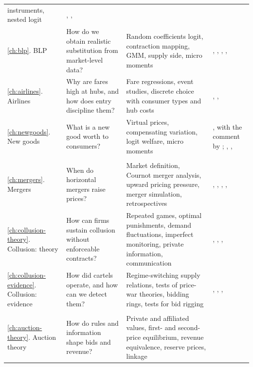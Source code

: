 \begin{table}[htbp]
\begin{tabularx}{\textwidth}{@{}>{\raggedright\arraybackslash}p{1.95cm}
  >{\raggedright\arraybackslash}X >{\raggedright\arraybackslash}X >{\raggedright\arraybackslash}X@{}}
  instruments, nested logit & \citet{Berry1994}, \citet{Einav2007}, \citet{Hendel1999} \\
\ref{ch:blp}. BLP & How do we obtain realistic substitution from market-level data? & Random coefficients
  logit, contraction mapping, GMM, supply side, micro moments & \citet{BerryLevinsohnPakes1995},
  \citet{Nevo2000a}, \citet{Nevo2001}, \citet{BerryLevinsohnPakes2004}, \citet{Goldberg1995} \\
\ref{ch:airlines}. Airlines & Why are fares high at hubs, and how does entry discipline them? & Fare
  regressions, event studies, discrete choice with consumer types and hub costs & \citet{Borenstein1989},
  \citet{WhinstonCollins1992}, \citet{BerryCarnallSpiller2006} \\
\ref{ch:newgoods}. New goods & What is a new good worth to consumers? & Virtual prices, compensating variation,
  logit welfare, micro moments & \citet{Hausman1997}, with the comment by \citet{Bresnahan1997};
  \citet{Trajtenberg1989}, \citet{Petrin2002}, \citet{Gentzkow2007} \\
\addlinespace
\multicolumn{4}{@{}l}{\textit{Part III. Competition policy}} \\
\ref{ch:mergers}. Mergers & When do horizontal mergers raise prices? & Market definition, Cournot merger
  analysis, upward pricing pressure, merger simulation, retrospectives & \citet{FarrellShapiro1990},
  \citet{FarrellShapiro2010}, \citet{Nevo2000b}, \citet{BjornerstedtVerboven2016},
  \citet{MillerWeinberg2017} \\
\ref{ch:collusion-theory}. Collusion: theory & How can firms sustain collusion without enforceable contracts? &
  Repeated games, optimal punishments, demand fluctuations, imperfect monitoring, private information,
  communication & \citet{GreenPorter1984}, \citet{RotembergSaloner1986},
  \citet{AtheyBagwellSanchirico2004}, \citet{HarringtonSkrzypacz2011} \\
\ref{ch:collusion-evidence}. Collusion: evidence & How did cartels operate, and how can we detect them? &
  Regime-switching supply relations, tests of price-war theories, bidding rings, tests for bid rigging &
  \citet{Porter1983}, \citet{Ellison1994}, \citet{PorterZona1993}, \citet{Asker2010} \\
\addlinespace
\multicolumn{4}{@{}l}{\textit{Part IV. Auctions}} \\
\ref{ch:auction-theory}. Auction theory & How do rules and information shape bids and revenue? & Private and
  affiliated values, first- and second-price equilibrium, revenue equivalence, reserve prices, linkage

\end{tabularx}
\end{table}
